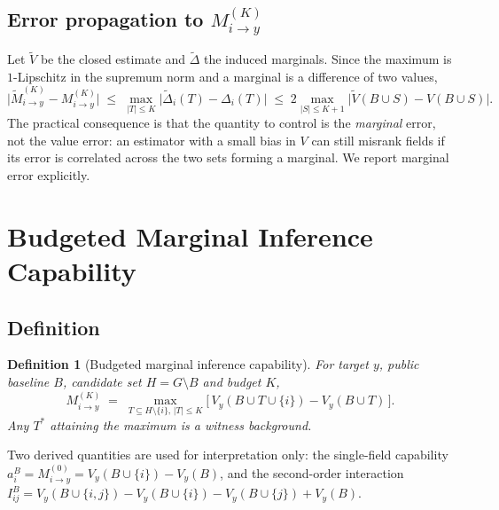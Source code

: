 \documentclass[preprint,12pt]{elsarticle}
\newtheorem{definition}{Definition}
\newcommand{\Vy}{V_{y}}
\newcommand{\Mik}{M^{(K)}_{i \to y}}
\begin{document}
\subsection{Error propagation to $\Mik$}
Let $\tilde V$ be the closed estimate and $\tilde\Delta$ the induced marginals. Since the
maximum is $1$-Lipschitz in the supremum norm and a marginal is a difference of two values,
\begin{equation}\label{eq:prop}
\big|\tilde M^{(K)}_{i\to y} - \Mik\big|
\;\le\; \max_{|T| \le K}\big|\tilde\Delta_i(T) - \Delta_i(T)\big|
\;\le\; 2 \max_{|S| \le K+1}\big|\tilde V(B \cup S) - V(B \cup S)\big| .
\end{equation}
The practical consequence is that the quantity to control is the \emph{marginal} error, not
the value error: an estimator with a small bias in $V$ can still misrank fields if its error
is correlated across the two sets forming a marginal. We report marginal error explicitly.

\section{Budgeted Marginal Inference Capability}\label{sec:mk}

\subsection{Definition}
\begin{definition}[Budgeted marginal inference capability]\label{def:mk}
For target $y$, public baseline $B$, candidate set $H=G\setminus B$ and budget $K$,
\begin{equation}
\Mik \;=\; \max_{T \subseteq H \setminus \{i\},\, |T| \le K}
\Big[\, \Vy(B \cup T \cup \{i\}) - \Vy(B \cup T) \,\Big].
\end{equation}
Any $T^{*}$ attaining the maximum is a \emph{witness background}.
\end{definition}

Two derived quantities are used for interpretation only:
the single-field capability $a^{B}_{i} = M^{(0)}_{i \to y} = \Vy(B\cup\{i\}) - \Vy(B)$,
and the second-order interaction
$I^{B}_{ij} = \Vy(B\cup\{i,j\}) - \Vy(B\cup\{i\}) - \Vy(B\cup\{j\}) + \Vy(B)$.
\end{document}
